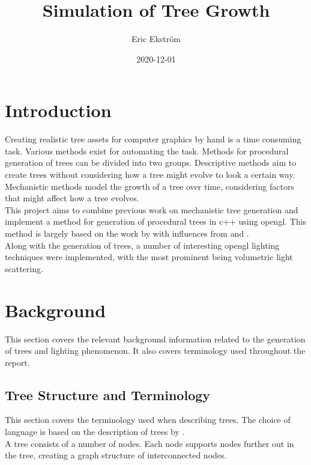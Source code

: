 \documentclass{article}
\title{Simulation of Tree Growth}
\date{2020-12-01}
\author{Eric Ekström}
\begin{document}
	
	\maketitle
	\newpage
  	\tableofcontents
  	\newpage

  	\section{Introduction}
  	
  	Creating realistic tree assets for computer graphics by hand is a time consuming task. Various methods exist for automating the task. Methods for procedural generation of trees can be divided into two groups. Descriptive methods aim to create trees without considering how a tree might evolve to look a certain way. Mechanistic methods model the growth of a tree over time, considering factors that might affect how a tree evolves. \\
  	
  	This project aims to combine previous work on mechanistic tree generation and implement a method for generation of procedural trees in c{\small++} using opengl. This method is largely based on the work by \cite{palubicki2009self} with influences from \cite{mvech1996visual} and \cite{yi2018tree}. \\
  	
  	Along with the generation of trees, a number of interesting opengl lighting techniques were implemented, with the most prominent being volumetric light scattering.
  		 
  	\section{Background}
  		
  		This section covers the relevant background information related to the generation of trees and lighting phenomenon. It also covers terminology used throughout the report. 
  		
  		\subsection{Tree Structure and Terminology}
  			This section covers the terminology used when describing trees. The choice of language is based on the description of trees by \citep{barthelemy2007plant}. \\
  			
  			A tree consists of a number of nodes. Each node supports nodes further out in the tree, creating a graph structure of interconnected nodes.
  			
\end{document}
